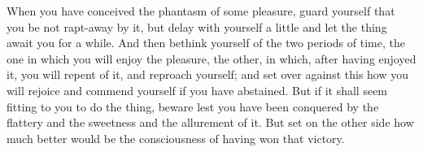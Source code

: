 When you have conceived the phantasm  of some pleasure, guard yourself that you
be not  rapt-away by it,  but delay  with yourself a  little and let  the thing
await you for  a while. And then  bethink yourself of the two  periods of time,
the one in which you will enjoy the pleasure, the other, in which, after having
enjoyed it, you will repent of it,  and reproach yourself; and set over against
this how you will rejoice and commend yourself if you have abstained. But if it
shall seem fitting to you to do  the thing, beware lest you have been conquered
by the  flattery and the  sweetness and  the allurement of  it. But set  on the
other  side how  much better  would  be the  consciousness of  having won  that
victory.

